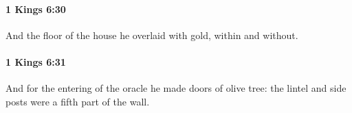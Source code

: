 		\paragraph{1 Kings 6:30} %
			\label{1KINGS-6-30}

			And the floor of the house he overlaid with gold, within and without.


		\paragraph{1 Kings 6:31} %
			\label{1KINGS-6-31}

			And for the entering of the oracle he made doors of olive tree: the lintel and side posts were a fifth part of the wall.


